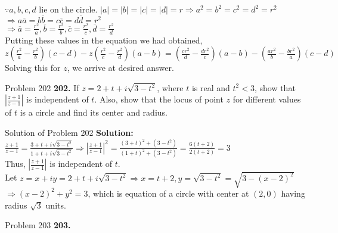 \documentclass[aspectratio=169,8pt]{beamer}
\begin{document}
\begin{frame}
  $\because a, b, c, d$ lie on the circle. $|a| = |b| = |c| = |d| = r \Rightarrow a^2 = b^2 = c^2 = d^2 = r^2$\\
  \vspace*{0.2cm}
  $\Rightarrow a\overline{a} = b\overline{b} = c\overline{c} = d\overline{d} = r^2$\\
  \vspace*{0.2cm}
  $\Rightarrow \overline{a} = \frac{r^2}{a}, \overline{b} = \frac{r^2}{b}, \overline{c} = \frac{r^2}{c}, \overline{d} =
  \frac{r^2}{d}$\\
  \vspace*{0.2cm}
  Putting these values in the equation we had obtained,
  $z\left(\frac{r^2}{a} - \frac{r^2}{b}\right)(c - d) - z\left(\frac{r^2}{c} - \frac{r^2}{d}\right)(a - b) = \left(\frac{cr^2}{d} -
  \frac{dr^2}{c}\right)(a - b) - \left(\frac{ar^2}{b} - \frac{br^2}{a}\right)(c - d)$\\
  \vspace*{0.2cm}
  Solving this for $z$, we arrive at desired answer.
\end{frame}
\begin{frame}{Problem 202}
  \textbf{202.} If $z = 2 + t + i\sqrt{3 - t^2}$, where $t$ is real and $t^2 < 3$, show that $\left|\frac{z + 1}{z - 1}\right|$ is
  independent of $t$. Also, show that the locus of point $z$ for different values of $t$ is a circle and find its center and
  radius.
\end{frame}
\begin{frame}{Solution of Problem 202}
  \textbf{Solution:} $\frac{z + 1}{z - 1} = \frac{3 + t + i\sqrt{3 - t^2}}{1 + t + i\sqrt{3 - t^2}} \Rightarrow \left|\frac{z +
    1}{z - 1}\right|^2 = \frac{(3 + t)^2 + (3 - t^2)}{(1 + t)^2 + (3 - t^2)} = \frac{6(t + 2)}{2(t + 2)} = 3$\\
  \vspace*{0.2cm}
  Thus, $\left|\frac{z + 1}{z - 1}\right|$ is independent of $t$.\\
  \vspace*{0.2cm}
  Let $z = x + iy = 2 + t + i\sqrt{3 - t^2} \Rightarrow x = t + 2, y = \sqrt{3 - t^2} = \sqrt{3 - (x - 2)^2}$\\
  \vspace*{0.2cm}
  $\Rightarrow (x - 2)^2 + y^2 = 3$, which is equation of a circle with center at $(2,  0)$ having radius $\sqrt{3}$ units.
\end{frame}
\begin{frame}{Problem 203}
  \textbf{203.}
\end{frame}
\end{document}
